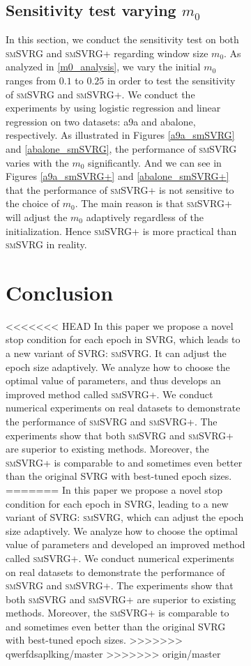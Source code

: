 \documentclass[conference]{IEEEtran}
\begin{document}
\begin{algorithm}[t]
\begin{itemize}
\begin{figure}[ht]
\begin{figure}[ht]
\subsection{Sensitivity test varying  $m_0$}
In this section, we conduct the sensitivity test on both \textsc{smSVRG} and \textsc{smSVRG+} regarding window size $m_0$. As analyzed in \ref{m0_analysis}, we vary the initial $m_0$ ranges from $0.1$ to $0.25$ in order to test the sensitivity of \textsc{smSVRG} and \textsc{smSVRG+}. We conduct the experiments by using logistic regression and linear regression on two datasets: a9a and abalone, respectively. As illustrated in Figures \ref{a9a_smSVRG} and \ref{abalone_smSVRG}, the performance of \textsc{smSVRG} varies with the $m_0$ significantly. And we can see in Figures \ref{a9a_smSVRG+} and \ref{abalone_smSVRG+} that the performance of \textsc{smSVRG+} is not sensitive to the choice of $m_0$. The main reason is that \textsc{smSVRG+} will adjust the $m_0$ adaptively regardless of the initialization. 
Hence \textsc{smSVRG+} is more practical than \textsc{smSVRG} in reality.

\section{Conclusion}
<<<<<<< HEAD
In this paper we propose a novel stop condition for each epoch in SVRG, which leads to a new variant of SVRG: \textsc{smSVRG}. It can adjust the epoch size adaptively. We analyze how to choose the optimal value of parameters, and thus develops an improved method called \textsc{smSVRG+}. We conduct numerical experiments on real datasets to demonstrate the performance of \textsc{smSVRG} and \textsc{smSVRG+}. The experiments show that both \textsc{smSVRG} and \textsc{smSVRG+} are superior to existing methods. Moreover, the \textsc{smSVRG+} is comparable to and sometimes even better than the original SVRG with best-tuned epoch sizes.
=======
In this paper we propose a novel stop condition for each epoch in SVRG, leading to a new variant of SVRG: \textsc{smSVRG}, which can adjust the epoch size adaptively. We analyze how to choose the optimal value of parameters and developed an improved method called \textsc{smSVRG+}. We conduct numerical experiments on real datasets to demonstrate the performance of \textsc{smSVRG} and \textsc{smSVRG+}. The experiments show that both \textsc{smSVRG} and \textsc{smSVRG+} are superior to existing methods. Moreover, the \textsc{smSVRG+} is comparable to and sometimes even better than the original SVRG with best-tuned epoch sizes.
>>>>>>> qwerfdsaplking/master
>>>>>>> origin/master
\label{conclusion}






\end{figure}
\end{figure}
\end{itemize}
\end{algorithm}
\end{document}
